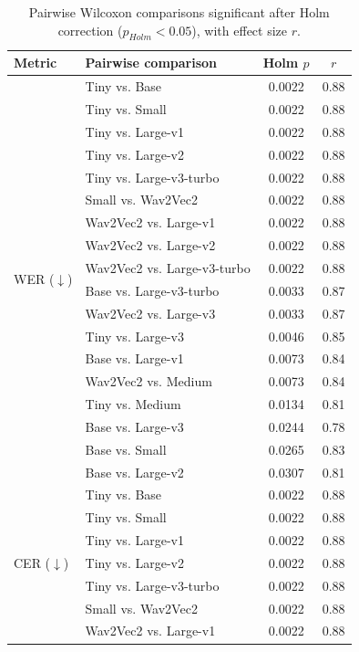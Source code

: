 \begin{table}[!t]
\centering
\caption{Pairwise Wilcoxon comparisons significant after Holm correction ($p_{Holm}<0.05$), with effect size $r$.}
\label{tab:wilcoxon}
\scriptsize
\renewcommand{\arraystretch}{1.0}
\begin{minipage}[t]{0.49\textwidth}
\centering
\begin{tabular}{@{}l l c c@{}}
\toprule
\textbf{Metric} & \textbf{Pairwise comparison} & \textbf{Holm $p$} & \textbf{$r$} \\
\midrule
\multirow{18}{*}{WER ($\downarrow$)}
 & Tiny vs. Base & 0.0022 & 0.88 \\
 & Tiny vs. Small & 0.0022 & 0.88 \\
 & Tiny vs. Large-v1 & 0.0022 & 0.88 \\
 & Tiny vs. Large-v2 & 0.0022 & 0.88 \\
 & Tiny vs. Large-v3-turbo & 0.0022 & 0.88 \\
 & Small vs. Wav2Vec2 & 0.0022 & 0.88 \\
 & Wav2Vec2 vs. Large-v1 & 0.0022 & 0.88 \\
 & Wav2Vec2 vs. Large-v2 & 0.0022 & 0.88 \\
 & Wav2Vec2 vs. Large-v3-turbo & 0.0022 & 0.88 \\
 & Base vs. Large-v3-turbo & 0.0033 & 0.87 \\
 & Wav2Vec2 vs. Large-v3 & 0.0033 & 0.87 \\
 & Tiny vs. Large-v3 & 0.0046 & 0.85 \\
 & Base vs. Large-v1 & 0.0073 & 0.84 \\
 & Wav2Vec2 vs. Medium & 0.0073 & 0.84 \\
 & Tiny vs. Medium & 0.0134 & 0.81 \\
 & Base vs. Large-v3 & 0.0244 & 0.78 \\
 & Base vs. Small & 0.0265 & 0.83 \\
 & Base vs. Large-v2 & 0.0307 & 0.81 \\
\midrule
\multirow{11}{*}{CER ($\downarrow$)}
 & Tiny vs. Base & 0.0022 & 0.88 \\
 & Tiny vs. Small & 0.0022 & 0.88 \\
 & Tiny vs. Large-v1 & 0.0022 & 0.88 \\
 & Tiny vs. Large-v2 & 0.0022 & 0.88 \\
 & Tiny vs. Large-v3-turbo & 0.0022 & 0.88 \\
 & Small vs. Wav2Vec2 & 0.0022 & 0.88 \\
 & Wav2Vec2 vs. Large-v1 & 0.0022 & 0.88 \\

\end{tabular}
\end{minipage}
\end{table}
